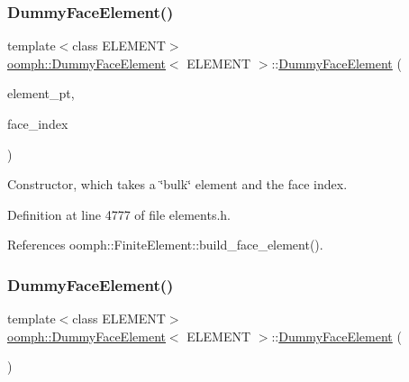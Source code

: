 \subsubsection{\texorpdfstring{Dummy\+Face\+Element()}{DummyFaceElement()}\hspace{0.1cm}{\footnotesize\ttfamily [1/2]}}
{\footnotesize\ttfamily template$<$class E\+L\+E\+M\+E\+NT$>$ \\
\hyperlink{classoomph_1_1DummyFaceElement}{oomph\+::\+Dummy\+Face\+Element}$<$ E\+L\+E\+M\+E\+NT $>$\+::\hyperlink{classoomph_1_1DummyFaceElement}{Dummy\+Face\+Element} (\begin{DoxyParamCaption}\item[{\hyperlink{classoomph_1_1FiniteElement}{Finite\+Element} $\ast$const \&}]{element\+\_\+pt,  }\item[{const int \&}]{face\+\_\+index }\end{DoxyParamCaption})\hspace{0.3cm}{\ttfamily [inline]}}



Constructor, which takes a \char`\"{}bulk\char`\"{} element and the face index. 



Definition at line 4777 of file elements.\+h.



References oomph\+::\+Finite\+Element\+::build\+\_\+face\+\_\+element().

\mbox{\label{classoomph_1_1DummyFaceElement_a176777e1996a968a9895e07dda2fb968}} 
\subsubsection{\texorpdfstring{Dummy\+Face\+Element()}{DummyFaceElement()}\hspace{0.1cm}{\footnotesize\ttfamily [2/2]}}
{\footnotesize\ttfamily template$<$class E\+L\+E\+M\+E\+NT$>$ \\
\hyperlink{classoomph_1_1DummyFaceElement}{oomph\+::\+Dummy\+Face\+Element}$<$ E\+L\+E\+M\+E\+NT $>$\+::\hyperlink{classoomph_1_1DummyFaceElement}{Dummy\+Face\+Element} (\begin{DoxyParamCaption}{ }\end{DoxyParamCaption})\hspace{0.3cm}{\ttfamily [inline]}}




